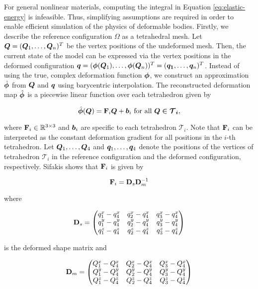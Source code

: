 For general nonlinear materials, computing the integral in Equation \ref{eq:elastic-energy} is infeasible. Thus, simplifying assumptions are required 
in order to enable efficient simulation of the physics of deformable bodies. Firstly, we describe the reference configuration $\Omega$ as a tetrahedral 
mesh. Let $\bm{Q} = (\bm{Q}_1, \ldots, \bm{Q}_n)^T$ be the vertex positions of the undeformed mesh. Then, the current 
state of the model can be expressed via the vertex positions in the deformed configuration $\bm{q} = (\bm{\phi}(\bm{Q}_1), \ldots, 
\bm{\phi}(\bm{Q}_n))^T = (\bm{q_1}, \ldots, \bm{q}_n)^T$. Instead of using the true, complex deformation function $\bm{\phi}$, we construct 
an approximation $\hat{\bm{\phi}}$ from $\bm{Q}$ and $\bm{q}$ using barycentric interpolation. The reconstructed deformation map $\hat{\bm{\phi}}$
is a piecewise linear function over each tetrahedron given by 

\[
    \hat{\bm{\phi}}(\bm{Q}) = \mathbf{F}_i \bm{Q} + \bm{b}_i \text{ for all } \bm{Q \in \mathcal{T}_i},
\]

\noindent where $\mathbf{F}_i \in \mathbb{R}^{3 \times 3}$ and $\bm{b}_i$ are specific to each tetrahedron $\mathcal{T}_i$. Note that $\mathbf{F}_i$ 
can be interpreted as the constant deformation gradient for all positions in the $i$-th tetrahedron. Let $\bm{Q}_1, \ldots, \bm{Q}_4$ and 
$\bm{q}_1, \ldots, \bm{q}_4$ denote the positions of the vertices of tetrahedron $\mathcal{T}_i$ in the reference configuration and the deformed 
configuration, respectively. Sifakis \cite{sifakis2012} shows that $\mathbf{F}_i$ is given by

\begin{equation}\label{eq:deformation-gradient-tet}
    \mathbf{F}_i = \mathbf{D}_s\mathbf{D}^{-1}_m
\end{equation}

\noindent where 

\[
    \mathbf{D}_s = \begin{pmatrix}
        q^x_1 - q^x_4 & q^x_2 - q^x_4 & q^x_3 - q^x_4 \\
        q^y_1 - q^y_4 & q^y_2 - q^y_4 & q^y_3 - q^y_4 \\
        q^z_1 - q^z_4 & q^z_2 - q^z_4 & q^z_3 - q^z_4
    \end{pmatrix}
\]

\noindent is the deformed shape matrix and 

\[
    \mathbf{D}_m = \begin{pmatrix}
        Q^x_1 - Q^x_4 & Q^x_2 - Q^x_4 & Q^x_3 - Q^x_4 \\
        Q^y_1 - Q^y_4 & Q^y_2 - Q^y_4 & Q^y_3 - Q^y_4 \\
        Q^z_1 - Q^z_4 & Q^z_2 - Q^z_4 & Q^z_3 - Q^z_4
    \end{pmatrix}
\]


